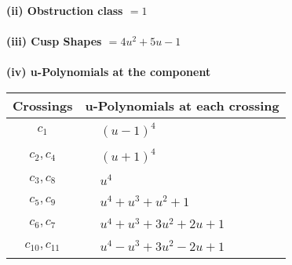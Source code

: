 \documentclass[1p]{elsarticle_modified}
\theoremstyle{definition}
\begin{document}
\flushleft \textbf{(ii) Obstruction class $= 1$}\\~\\
\flushleft \textbf{(iii) Cusp Shapes $= 4 u^2+5 u-1$}\\~\\
\newpage\renewcommand{\arraystretch}{1}
\flushleft \textbf{(iv) u-Polynomials at the component}\newline \\
\begin{tabular}{m{50pt}|m{274pt}}
Crossings & \hspace{64pt}u-Polynomials at each crossing \\
\hline $$\begin{aligned}c_{1}\end{aligned}$$&$\begin{aligned}
&(u-1)^4
\end{aligned}$\\
\hline $$\begin{aligned}c_{2},c_{4}\end{aligned}$$&$\begin{aligned}
&(u+1)^4
\end{aligned}$\\
\hline $$\begin{aligned}c_{3},c_{8}\end{aligned}$$&$\begin{aligned}
&u^4
\end{aligned}$\\
\hline $$\begin{aligned}c_{5},c_{9}\end{aligned}$$&$\begin{aligned}
&u^4+u^3+u^2+1
\end{aligned}$\\
\hline $$\begin{aligned}c_{6},c_{7}\end{aligned}$$&$\begin{aligned}
&u^4+u^3+3 u^2+2 u+1
\end{aligned}$\\
\hline $$\begin{aligned}c_{10},c_{11}\end{aligned}$$&$\begin{aligned}
&u^4- u^3+3 u^2-2 u+1
\end{aligned}$\\
\hline
\end{tabular}\\~\\
\end{document}
